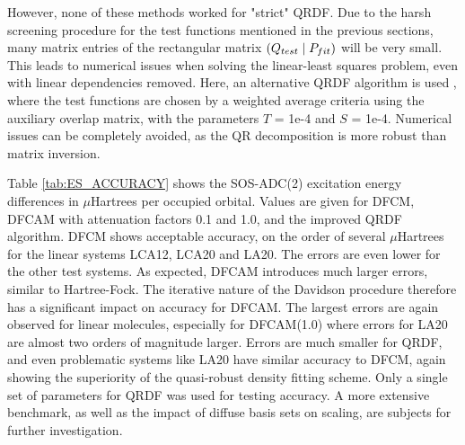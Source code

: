 However, none of these methods worked for "strict" QRDF. Due to the harsh screening procedure for the test functions mentioned in the previous sections, many matrix entries of the rectangular matrix $\left( Q_{test} \mid P_{fit} \right)$ will be very small. This leads to numerical issues when solving the linear-least squares problem, even with linear dependencies removed. Here, an alternative QRDF algorithm is used %
, where the test functions are chosen by a weighted average criteria using the auxiliary overlap matrix, with the parameters $T$ = 1e-4 and $S$ = 1e-4. Numerical issues can be completely avoided, as the QR decomposition is more robust than matrix inversion. %

Table \ref{tab:ES_ACCURACY} shows the SOS-ADC(2) excitation energy differences in $\mu$Hartrees per occupied orbital. Values are given for DFCM, DFCAM with attenuation factors 0.1 and 1.0, and the improved QRDF algorithm. DFCM shows acceptable accuracy, on the order of several $\mu$Hartrees for the linear systems LCA12, LCA20 and LA20. The errors are even lower for the other test systems. As expected, DFCAM introduces much larger errors, similar to Hartree-Fock. The iterative nature of the Davidson procedure therefore has a significant impact on accuracy for DFCAM. The largest errors are again observed for linear molecules, especially for DFCAM(1.0) where errors for LA20 are almost two orders of magnitude larger. Errors are much smaller for QRDF, and even problematic systems like LA20 have similar accuracy to DFCM, again showing the superiority of the quasi-robust density fitting scheme. Only a single set of parameters for QRDF was used for testing accuracy. A more extensive benchmark, as well as the impact of diffuse basis sets on scaling, are subjects for further investigation.


